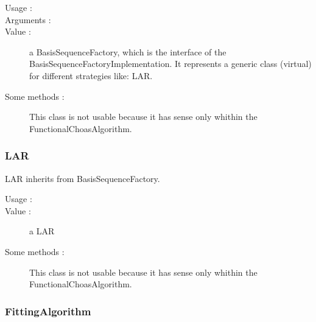       \begin{description}
         \item[Usage :] \rule{0pt}{1em}

         \item[Arguments :] \rule{0pt}{1em}

         \item[Value :]  a BasisSequenceFactory, which is the interface of the BasisSequenceFactoryImplementation. It represents a generic class (virtual) for different strategies like: LAR.

         \item[Some methods :]  This class is not usable because it has sense only whithin the FunctionalChoasAlgorithm.

      \end{description}



\subsubsection{LAR}

      LAR inherits from BasisSequenceFactory.

      \begin{description}
         \item[Usage :] \strut

         \item[Value :]  a LAR

         \item[Some methods :]  This class is not usable because it has sense only whithin the FunctionalChoasAlgorithm.

      \end{description}

\newpage \subsubsection{FittingAlgorithm}

